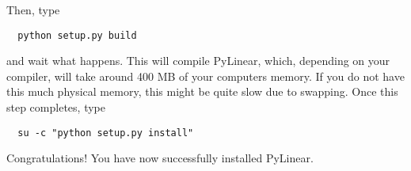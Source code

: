 Then, type
\begin{verbatim}
  python setup.py build
\end{verbatim}
and wait what happens. This will compile PyLinear, which, depending on
your compiler, will take around 400 MB of your computers memory. If you
do not have this much physical memory, this might be quite slow due to
swapping. Once this step completes, type
\begin{verbatim}
  su -c "python setup.py install"
\end{verbatim}
Congratulations! You have now successfully installed PyLinear.
